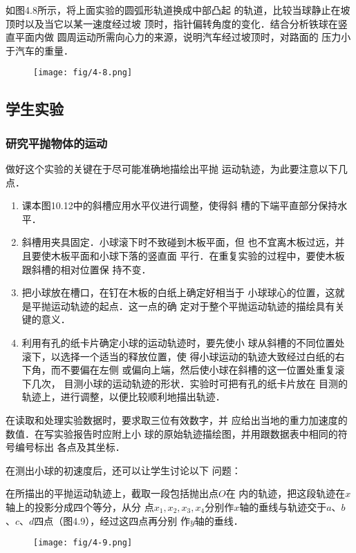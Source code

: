 如图4.8所示，将上面实验的圆弧形轨道换成中部凸起
的轨道，比较当球静止在坡顶时以及当它以某一速度经过坡
顶时，指针偏转角度的变化．结合分析铁球在竖直平面内做
圆周运动所需向心力的来源，说明汽车经过坡顶时，对路面的
压力小于汽车的重量．


\begin{figure}[htp]
    \centering
    \texttt{[image: fig/4-8.png]}
    \caption{}
\end{figure}

\subsection{学生实验}
\subsubsection{研究平抛物体的运动}

做好这个实验的关键在于尽可能准确地描绘出平抛
运动轨迹，为此要注意以下几点．
\begin{enumerate}
\item 课本图10.12中的斜槽应用水平仪进行调整，使得斜
槽的下端平直部分保持水平．
\item 斜槽用夹具固定．小球滚下时不致碰到木板平面，但
也不宜离木板过远，并且要使木板平面和小球下落的竖直面
平行．在重复实验的过程中，要使木板跟斜槽的相对位置保
持不变．
\item 把小球放在槽口，在钉在木板的白纸上确定好相当于
小球球心的位置，这就是平抛运动轨迹的起点．这一点的确
定对于整个平抛运动轨迹的描绘具有关键的意义．
\item 利用有孔的纸卡片确定小球的运动轨迹时，要先使小
球从斜槽的不同位置处滚下，以选择一个适当的释放位置，使
得小球运动的轨迹大致经过白纸的右下角，而不要偏在左侧
或偏向上端，然后使小球在斜槽的这一位置处重复滚下几次，
目测小球的运动轨迹的形状．实验时可把有孔的纸卡片放在
目测的轨迹上，进行调整，以便比较顺利地描出轨迹．
\end{enumerate}

在读取和处理实验数据时，要求取三位有效数字，并
应给出当地的重力加速度的数值．在写实验报告时应附上小
球的原始轨迹描绘图，并用跟数据表中相同的符号编号标出
各点及其坐标．

在测出小球的初速度后，还可以让学生讨论以下
问题：

在所描出的平抛运动轨迹上，截取一段包括抛出点$O$在
内的轨迹，把这段轨迹在$x$轴上的投影分成四个等分，从分
点$x_1,x_2,x_3,x_4$分别作$x$轴的垂线与轨迹交于$a$、$b$、$c$、$d$四点（图4.9），经过这四点再分别
作$y$轴的垂线．
\begin{figure}[htp]
    \centering
    \texttt{[image: fig/4-9.png]}
    \caption{}
\end{figure}

